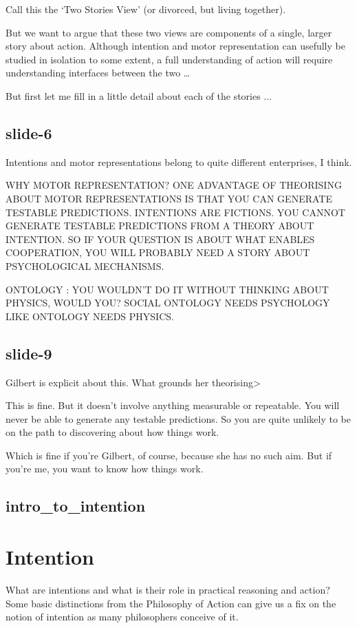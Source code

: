 \documentclass[12pt,\papersize]{extarticle}
\begin{document}
Call this the ‘Two Stories View’ (or divorced, but living together).
 
But we want to argue that these two views are components of a single, larger story about action.
Although intention and motor representation can usefully be studied in isolation
to some extent, a full understanding of action will require understanding
interfaces between the two …
 
But first let me fill in a little detail about each of the stories ...
 
\subsection{slide-6}
Intentions and motor representations belong to quite different enterprises, I think.
 
WHY MOTOR REPRESENTATION? ONE ADVANTAGE OF THEORISING ABOUT MOTOR REPRESENTATIONS IS
THAT YOU CAN GENERATE TESTABLE PREDICTIONS. INTENTIONS ARE FICTIONS. YOU CANNOT GENERATE
TESTABLE PREDICTIONS FROM A THEORY ABOUT INTENTION. SO IF YOUR QUESTION IS ABOUT WHAT
ENABLES COOPERATION, YOU WILL PROBABLY NEED A STORY ABOUT PSYCHOLOGICAL MECHANISMS.
 
ONTOLOGY : YOU WOULDN’T DO IT WITHOUT THINKING ABOUT PHYSICS, WOULD YOU?
SOCIAL ONTOLOGY NEEDS PSYCHOLOGY LIKE ONTOLOGY NEEDS PHYSICS.
 
\subsection{slide-9}
Gilbert is explicit about this.
What grounds her theorising>
 
This is fine. But it doesn't involve anything measurable or repeatable.
You will never be able to generate any testable predictions.
So you are quite unlikely to be on the path to discovering about how things work.
 
Which is fine if you’re Gilbert, of course, because she has no such aim.
But if you’re me, you want to know how things work.
 
\subsection{intro\_to\_intention}
 
 
\section{Intention}
 
What are intentions and what is their role in practical reasoning and action? Some basic
distinctions from the Philosophy of Action can give us a fix on the notion of intention as
many philosophers conceive of it.
 
\end{document}
